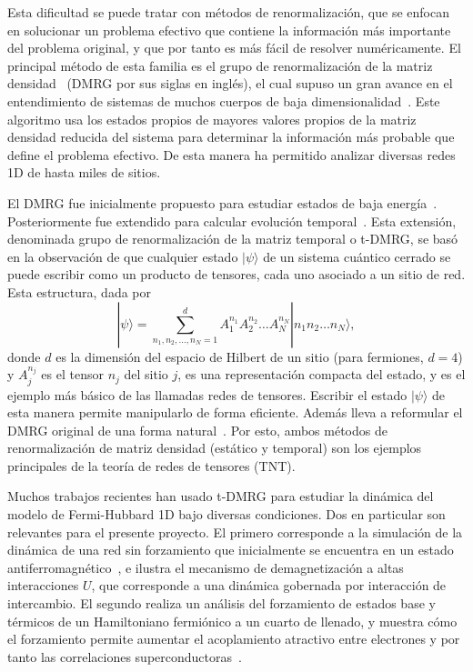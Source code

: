 \documentclass[a4paper,10pt]{article}
\begin{document}
Esta dificultad se puede tratar con m\'etodos de renormalizaci\'on, que se enfocan en solucionar un problema efectivo que contiene la informaci\'on m\'as importante del problema original, y que por tanto es m\'as f\'acil de resolver num\'ericamente. El principal m\'etodo de esta familia es el grupo de renormalizaci\'on de la matriz densidad~\cite{white1992prl} (DMRG por sus siglas en ingl\'es), el cual supuso un gran avance en el entendimiento de sistemas de muchos cuerpos de baja dimensionalidad~\cite{schollwock2011ann}. Este algoritmo usa los estados propios de mayores valores propios de la matriz densidad reducida del sistema para determinar la informaci\'on m\'as probable que define el problema efectivo. De esta manera ha permitido analizar diversas redes 1D de hasta miles de sitios.

El DMRG fue inicialmente propuesto para estudiar estados de baja energ\'ia~\cite{white1992prl}. Posteriormente fue extendido para calcular evoluci\'on temporal~\cite{vidal2004prl}. Esta extensi\'on, denominada grupo de renormalizaci\'on de la matriz temporal o t-DMRG, se bas\'o en la observaci\'on de que cualquier estado $|\psi\rangle$ de un sistema cu\'antico cerrado se puede escribir como un producto de tensores, cada uno asociado a un sitio de red. Esta estructura, dada por
\begin{equation}
|\psi\rangle=\sum_{n_1,n_2,\ldots,n_N=1}^dA_1^{n_1}A_2^{n_2}\ldots A_N^{n_N}|n_1n_2\ldots n_N\rangle,
\end{equation} 
donde $d$ es la dimensi\'on del espacio de Hilbert de un sitio (para fermiones, $d=4$) y $A_j^{n_j}$ es el tensor $n_j$ del sitio $j$, es una representaci\'on compacta del estado, y es el ejemplo m\'as b\'asico de las llamadas redes de tensores. Escribir el estado $|\psi\rangle$ de esta manera permite manipularlo de forma eficiente. Adem\'as lleva a reformular el DMRG original de una forma natural~\cite{schollwock2011ann}. Por esto, ambos m\'etodos de renormalizaci\'on de matriz densidad (est\'atico y temporal) son los ejemplos principales de la teor\'ia de redes de tensores (TNT).

Muchos trabajos recientes han usado t-DMRG para estudiar la din\'amica del modelo de Fermi-Hubbard 1D bajo diversas condiciones. Dos en particular son relevantes para el presente proyecto. El primero corresponde a la simulaci\'on de la din\'amica de una red sin forzamiento que inicialmente se encuentra en un estado antiferromagn\'etico~\cite{heidrich_meisner2015pra}, e ilustra el mecanismo de demagnetizaci\'on a altas interacciones $U$, que corresponde a una din\'amica gobernada por interacci\'on de intercambio.
El segundo realiza un an\'alisis del forzamiento de estados base y t\'ermicos de un Hamiltoniano fermi\'onico a un cuarto de llenado, y muestra c\'omo el forzamiento permite aumentar el acoplamiento atractivo entre electrones y por tanto las correlaciones superconductoras~\cite{jonathan2016}.
\end{document}
